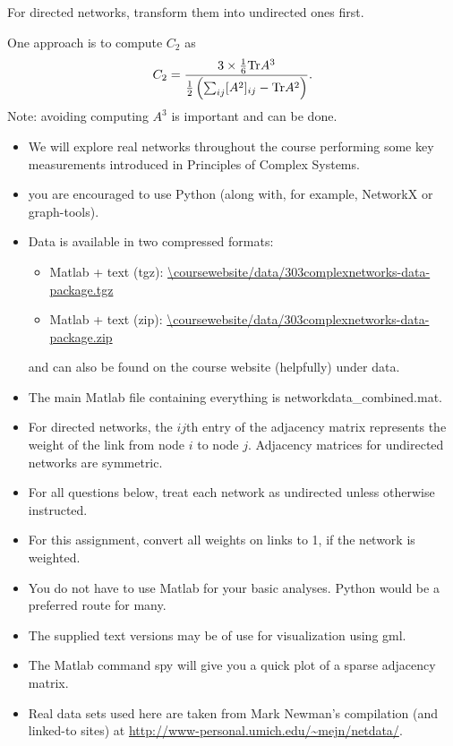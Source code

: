 \begin{enumerate}
  For directed networks, transform them into undirected ones
  first.
  
  One approach is to compute $C_{2}$ as
  $$
  C_{2}
  =
  \frac{
    3
    \times
    \frac{1}{6}{\rm Tr} A^{3} 
  }
  {
    \frac{1}{2}
    \left(
      \sum_{ij} [A^{2}]_{ij}
      -
      {\rm Tr} A^{2}
    \right)
  }.
  $$
  Note: avoiding computing $A^{3}$ is important
  and can be done.

 


  
   \solutionstart


   \solutionend

\end{enumerate}

\begin{itemize}
\item 
  We will explore real networks throughout
  the course
  performing some key measurements introduced
  in Principles of Complex Systems.
\item

  you are encouraged to use Python
  (along with, for example, NetworkX or graph-tools).
\item
  Data is available in two compressed formats:
  \begin{itemize}
  \item 
    Matlab + text (tgz): \url{\coursewebsite/data/303complexnetworks-data-package.tgz}
  \item 
    Matlab + text (zip): \url{\coursewebsite/data/303complexnetworks-data-package.zip}
  \end{itemize}
  and can also be found on the course website (helpfully) under data.
\item
  The main Matlab file containing everything is networkdata\_{c}ombined.mat.
\item
  For directed networks, the $ij$th entry of the adjacency matrix
  represents the weight of the link from node $i$ to node $j$.
  Adjacency matrices for undirected networks are symmetric.
\item
  For all questions below, 
  treat each network as undirected unless otherwise instructed.
\item
  For this assignment, convert all weights on
  links to 1, if the network is weighted.
\item 
  You do not have to use Matlab for your basic
  analyses.
  Python would be a preferred route for many.
\item 
  The supplied text versions may be of
  use for visualization using gml.
\item
  The Matlab command spy will give you a quick plot
  of a sparse adjacency matrix.
\item
  Real data sets used here are taken
  from Mark Newman's compilation (and linked-to sites) at
  \url{http://www-personal.umich.edu/~mejn/netdata/}.
\end{itemize}

